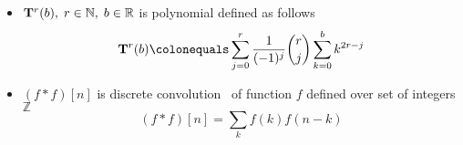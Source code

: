 \begin{itemize}
    \item ${\mathbf{T}}\sp{r} (b), \; r \in \mathbb{N}, \; b \in \mathbb{R}$ is polynomial defined as follows
    \begin{equation}
        \label{eq:def_polynomial_t}
        \polynomialT{r}{b} \colonequals \sum_{j=0}^{r} \frac{1}{(-1)^j} \binom{r}{j} \sum_{k=0}^{b} k^{2r-j}
    \end{equation}

    \item $(f\ast f)[n]$ is discrete convolution~\cite{DiscConv} of function $f$ defined over set of integers $\mathbb{Z}$
    \[
        (f\ast f)[n] = \sum_{k} f(k) f(n-k)
    \]


\end{itemize}
